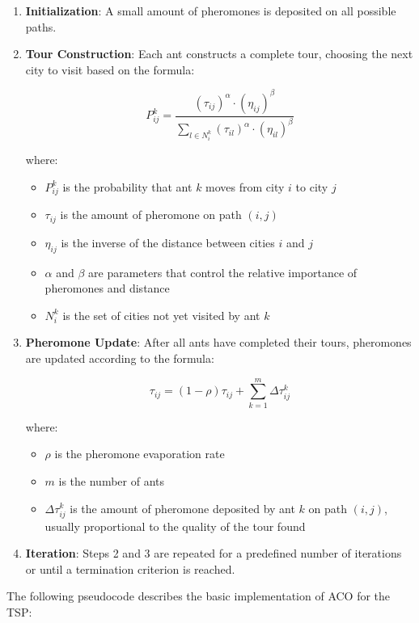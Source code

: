\begin{enumerate}
	\item \textbf{Initialization}: A small amount of pheromones is deposited on all possible paths.
	\item \textbf{Tour Construction}: Each ant constructs a complete tour, choosing the next city to visit based on the formula:

	      \[P_{ij}^k = \frac{(\tau_{ij})^\alpha \cdot (\eta_{ij})^\beta}{\sum_{l \in N_i^k} (\tau_{il})^\alpha \cdot (\eta_{il})^\beta}\]

	      where:
	      \begin{itemize}
		      \item $P_{ij}^k$ is the probability that ant $k$ moves from city $i$ to city $j$
		      \item $\tau_{ij}$ is the amount of pheromone on path $(i,j)$
		      \item $\eta_{ij}$ is the inverse of the distance between cities $i$ and $j$
		      \item $\alpha$ and $\beta$ are parameters that control the relative importance of pheromones and distance
		      \item $N_i^k$ is the set of cities not yet visited by ant $k$
	      \end{itemize}

	\item \textbf{Pheromone Update}: After all ants have completed their tours, pheromones are updated according to the formula:

	      \[\tau_{ij} = (1-\rho)\tau_{ij} + \sum_{k=1}^m \Delta\tau_{ij}^k\]

	      where:
	      \begin{itemize}
		      \item $\rho$ is the pheromone evaporation rate
		      \item $m$ is the number of ants
		      \item $\Delta\tau_{ij}^k$ is the amount of pheromone deposited by ant $k$ on path $(i,j)$, usually proportional to the quality of the tour found
	      \end{itemize}

	\item \textbf{Iteration}: Steps 2 and 3 are repeated for a predefined number of iterations or until a termination criterion is reached.
\end{enumerate}

The following pseudocode describes the basic implementation of \Gls{ACO} for the \Gls{TSP}:

